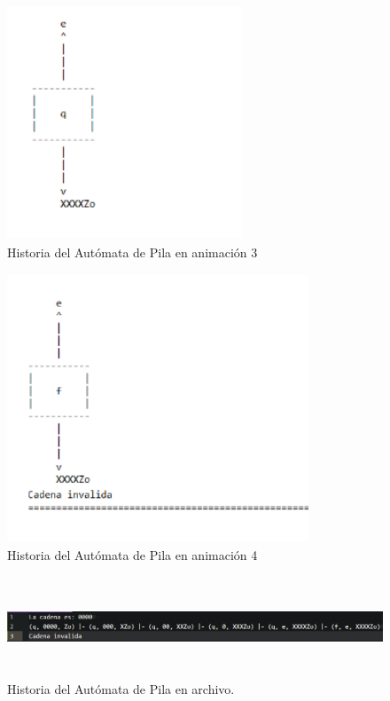 	\begin{figure}[H]
		\begin{center}
			\includegraphics[width=7cm, height=7cm]{img/pila-automatico-consola3.png}
			\caption{Historia del Autómata de Pila en animación 3}
			\label{fig:pila2c}
		\end{center}
	\end{figure}
	\begin{figure}[H]
		\begin{center}
			\includegraphics[width=9cm, height=8cm]{img/pila-automatico-consola4.png}
			\caption{Historia del Autómata de Pila en animación 4}
			\label{fig:pila2d}
		\end{center}
	\end{figure}
	\begin{figure}[H]
		\begin{center}
			\includegraphics[width=\linewidth, height=3cm]{img/pila-automatico-archivo.png}
			\caption{Historia del Autómata de Pila en archivo.}
			\label{fig:pila4}
		\end{center}
	
	\end{figure}

